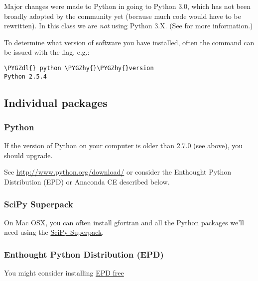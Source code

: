 \documentclass[letterpaper,10pt,english]{sphinxmanual}
\def\PYGZdl{\char`\$}
\def\PYGZhy{\char`\-}
\begin{document}
Major changes were made to Python in going to Python 3.0, which has not been
broadly adopted by the community yet (because much code would have to be
rewritten).  In this class we are \emph{not} using Python 3.X.  (See
\label{software_installation:id2}{\hyperref[biblio:python\string-3\string-0\string-tutorial]{}} for more information.)

To determine what version of software
you have installed, often the command can be issued with the 
flag, e.g.:

\begin{Verbatim}[commandchars=\\\{\}]
\PYGZdl{} python \PYGZhy{}\PYGZhy{}version
Python 2.5.4
\end{Verbatim}


\subsection{Individual packages}
\label{software_installation:individual-packages}

\subsubsection{Python}
\label{software_installation:python}\label{software_installation:installing-python}
If the version of Python on your computer is older than 2.7.0 (see above),
you should upgrade.

See \url{http://www.python.org/download/} or consider the Enthought Python
Distribution (EPD) or Anaconda CE described below.


\subsubsection{SciPy Superpack}
\label{software_installation:scipy-superpack}\label{software_installation:installing-superpack}
On Mac OSX, you can often install gfortran and all the Python packages we'll
need using the \href{http://fonnesbeck.github.com/ScipySuperpack/}{SciPy Superpack}.


\subsubsection{Enthought Python Distribution (EPD)}
\label{software_installation:enthought-python-distribution-epd}\label{software_installation:installing-epd}
You might consider installing
\href{http://www.enthought.com/products/epd\_free.php}{EPD free}
\end{document}
